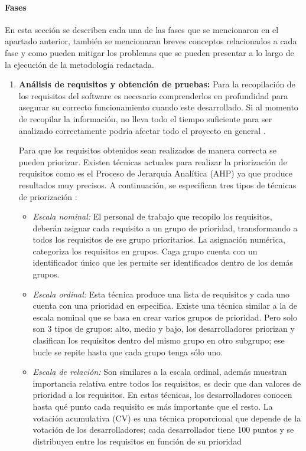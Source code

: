 \paragraph{Fases}

En esta sección se describen cada una de las fases que se mencionaron en el apartado anterior, también se mencionaran breves conceptos relacionados a cada fase y como pueden mitigar los problemas que se pueden presentar a lo largo de la ejecución de la metodología redactada. 

\begin{enumerate}
	\item \textbf{Análisis de requisitos y obtención de pruebas:} Para la recopilación de los requisitos del software es necesario comprenderlos en profundidad para asegurar su correcto funcionamiento cuando este desarrollado. Si al momento de recopilar la información, no lleva todo el tiempo suficiente para ser analizado correctamente podría afectar todo el proyecto en general \cite{Mohamed}.
	
	Para que los requisitos obtenidos sean realizados de manera correcta se pueden priorizar. Existen técnicas actuales para realizar la priorización de requisitos como es el Proceso de Jerarquía Analítica (AHP) ya que produce resultados muy precisos. A continuación, se especifican  tres tipos de técnicas de priorización \cite{Mohamed}:
	
	\begin{itemize}
		\item \textit{Escala nominal: } El personal de trabajo que recopilo los requisitos, deberán asignar cada requisito a un grupo de prioridad, transformando a todos los requisitos de ese grupo prioritarios. La asignación numérica, categoriza los requisitos en grupos. Caga grupo cuenta con un identificador único que les permite ser identificados dentro de los demás grupos. 
		\item \textit{Escala ordinal: } Esta técnica produce una lista de requisitos y cada uno cuenta con una prioridad en especifica. Existe una técnica similar a la de escala nominal que se basa en crear varios grupos de prioridad. Pero solo son 3 tipos de grupos: alto, medio y bajo, los desarrolladores priorizan y clasifican los requisitos dentro del mismo grupo en otro subgrupo; ese bucle se repite hasta que cada grupo tenga sólo uno.
		\item \textit{Escala de relación: }Son similares a la escala ordinal, además muestran importancia relativa entre todos los requisitos, es decir que dan valores de prioridad a los requisitos.	En estas técnicas, los desarrolladores conocen hasta qué punto cada requisito es más importante que el resto. La votación acumulativa (CV) es una técnica proporcional que depende de la votación de los desarrolladores; cada desarrollador tiene 100 puntos y se distribuyen entre los requisitos en función de su prioridad 
	\end{itemize}
	

\end{enumerate}
